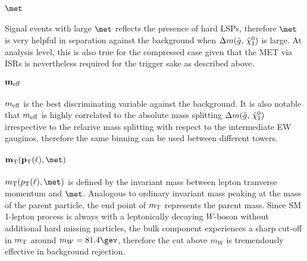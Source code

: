 \paragraph{${\bf \met}$}
Signal events with large $\met$ reflects the presence of hard LSPs,
therefore $\met$ is very helpful in separation against the background when $\Delta m(\tilde{g}, \, \tilde{\chi}_{1}^{0})$ is large.
At analysis level, this is also true for the compressed case given that the MET via ISRs is nevertheless required for the trigger sake as described above.

\paragraph{${\bf m_{\mathrm{eff}}}$} 
$m_{\mathrm{eff}}$ is the best discriminating variable against the background.
It is also notable that $m_{\mathrm{eff}}$ is highly correlated to the absolute mass splitting $\Delta m(\tilde{g}, \, \tilde{\chi}_{1}^{0})$ irrespective to the relarive mass splitting with respect to the intermediate EW gauginos, therefore the same binning can be used between different towers.


\paragraph{${\bf \mtFull}$} 
$\mtFull$ is defined by the invariant mass between lepton tranverse momentum and $\met$.
Analogous to ordinary invariant mass peaking at the mass of the parent particle, 
the end point of $m_{\mathrm{T}}$ represents the parent mass.
Since SM 1-lepton process is always with a leptonically decaying $W$-boson without additional hard missing particles, the bulk component experiences a sharp cut-off in $m_{\mathrm{T}}$ around $m_W = 81.4 \gev$, 
therefore the cut above $m_W$ is tremendously effective in background rejection.


